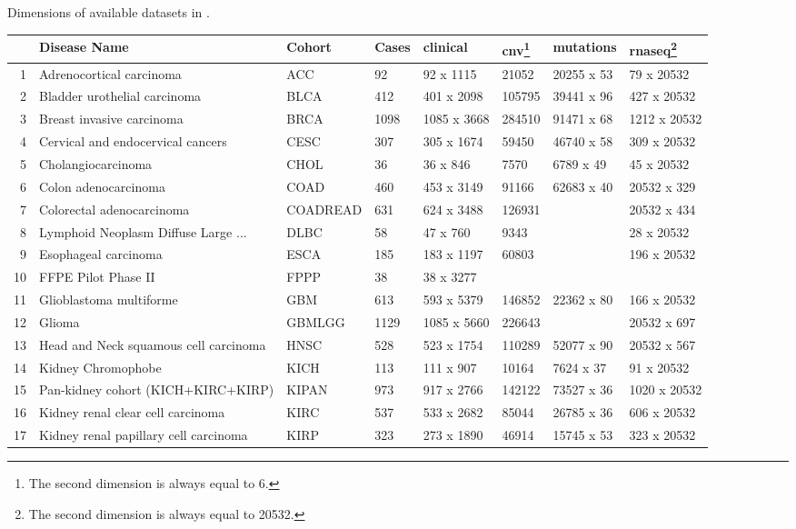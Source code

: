 \begin{widetable}[h]
\centering
\caption{\label{data_details}Dimensions of available datasets in .}
\begin{tabular}{rlllllll}
  \toprule
 & Disease Name & Cohort & Cases & clinical & cnv\footnote{The second dimension is always equal to 6.} & mutations & rnaseq\footnote{The second dimension is always equal to 20532.} \\ 
  \toprule
1 & Adrenocortical carcinoma & ACC & 92 & 92 x 1115 & 21052 & 20255 x 53 & 79 x 20532 \\ 
  2 & Bladder urothelial carcinoma & BLCA & 412 & 401 x 2098 & 105795 & 39441 x 96 & 427 x 20532 \\ 
  3 & Breast invasive carcinoma & BRCA & 1098 & 1085 x 3668 & 284510 & 91471 x 68 & 1212 x 20532 \\ 
  4 & Cervical and endocervical cancers & CESC & 307 & 305 x 1674 & 59450 & 46740 x 58 & 309 x 20532 \\ 
  5 & Cholangiocarcinoma & CHOL & 36 & 36 x 846 & 7570 & 6789 x 49 & 45 x 20532 \\ 
  6 & Colon adenocarcinoma & COAD & 460 & 453 x 3149 & 91166 & 62683 x 40 & 20532 x 329 \\ 
  7 & Colorectal adenocarcinoma & COADREAD & 631 & 624 x 3488 & 126931 &  & 20532 x 434 \\ 
  8 & Lymphoid Neoplasm Diffuse Large ... & DLBC & 58 & 47 x 760 & 9343 &  & 28 x 20532 \\ 
  9 & Esophageal carcinoma & ESCA & 185 & 183 x 1197 & 60803 &  & 196 x 20532 \\ 
  10 & FFPE Pilot Phase II & FPPP & 38 & 38 x 3277 &  &  &  \\ 
  11 & Glioblastoma multiforme & GBM & 613 & 593 x 5379 & 146852 & 22362 x 80 & 166 x 20532 \\ 
  12 & Glioma & GBMLGG & 1129 & 1085 x 5660 & 226643 &  & 20532 x 697 \\ 
  13 & Head and Neck squamous cell carcinoma & HNSC & 528 & 523 x 1754 & 110289 & 52077 x 90 & 20532 x 567 \\ 
  14 & Kidney Chromophobe & KICH & 113 & 111 x 907 & 10164 & 7624 x 37 & 91 x 20532 \\ 
  15 & Pan-kidney cohort (KICH+KIRC+KIRP) & KIPAN & 973 & 917 x 2766 & 142122 & 73527 x 36 & 1020 x 20532 \\ 
  16 & Kidney renal clear cell carcinoma & KIRC & 537 & 533 x 2682 & 85044 & 26785 x 36 & 606 x 20532 \\ 
  17 & Kidney renal papillary cell carcinoma & KIRP & 323 & 273 x 1890 & 46914 & 15745 x 53 & 323 x 20532 \\ 

\end{tabular}
\end{widetable}
